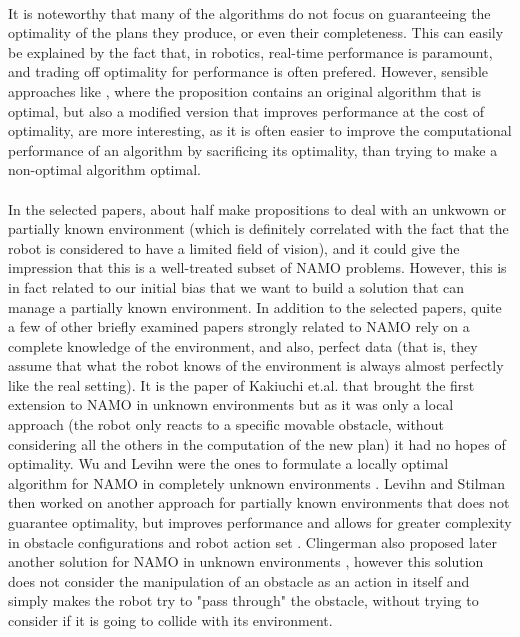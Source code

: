 \paragraph{} It is noteworthy that many of the algorithms do not focus on guaranteeing the optimality of the plans they produce, or even their completeness. This can easily be explained by the fact that, in robotics, real-time performance is paramount, and trading off optimality for performance is often prefered. However, sensible approaches like \parencite{stilman_navigation_2005, wu_navigation_2010}, where the proposition contains an original algorithm that is optimal, but also a modified version that improves performance at the cost of optimality, are more interesting, as it is often easier to improve the computational performance of an algorithm by sacrificing its optimality, than trying to make a non-optimal algorithm optimal.

\paragraph{} In the selected papers, about half make propositions to deal with an unkwown or partially known environment (which is definitely correlated with the fact that the robot is considered to have a limited field of vision), and it could give the impression that this is a well-treated subset of NAMO problems. However, this is in fact related to our initial bias that we want to build a solution that can manage a partially known environment. In addition to the selected papers, quite a few of other briefly examined papers strongly related to NAMO \parencite{chen_practical_1991, okada_humanoid_2005, nieuwenhuisen_effective_2008, berg_path_2009, kaelbling_hierarchical_2011, levihn_hierarchical_2013, levihn_autonomous_2014} rely on a complete knowledge of the environment, and also, perfect data (that is, they assume that what the robot knows of the environment is always almost perfectly like the real setting). It is the paper of Kakiuchi et.al. \parencite{kakiuchi_working_2010} that brought the first extension to NAMO in unknown environments \parencite{levihn_locally_2014} but as it was only a local approach (the robot only reacts to a specific movable obstacle, without considering all the others in the computation of the new plan) it had no hopes of optimality. Wu and Levihn were the ones to formulate a locally optimal algorithm for NAMO in completely unknown environments \parencite{wu_navigation_2010, levihn_locally_2014}. Levihn and Stilman then worked on another approach for partially known environments that does not guarantee optimality, but improves performance and allows for greater complexity in obstacle configurations and robot action set \parencite{levihn_foresight_2013}. Clingerman also proposed later another solution for NAMO in unknown environments \parencite{clingerman_estimating_2014, clingerman_dynamic_2015}, however this solution does not consider the manipulation of an obstacle as an action in itself and simply makes the robot try to "pass through" the obstacle, without trying to consider if it is going to collide with its environment.

